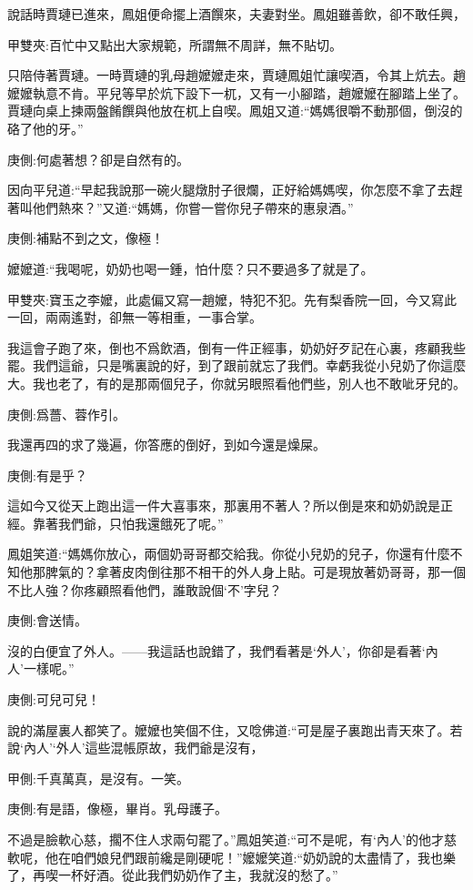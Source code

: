 \begin{parag}
    說話時賈璉已進來，鳳姐便命擺上酒饌來，夫妻對坐。鳳姐雖善飲，卻不敢任興，\begin{note}甲雙夾:百忙中又點出大家規範，所謂無不周詳，無不貼切。\end{note}只陪侍著賈璉。一時賈璉的乳母趙嬤嬤走來，賈璉鳳姐忙讓喫酒，令其上炕去。趙嬤嬤執意不肯。平兒等早於炕下設下一杌，又有一小腳踏，趙嬤嬤在腳踏上坐了。賈璉向桌上揀兩盤餚饌與他放在杌上自喫。鳳姐又道:“媽媽很嚼不動那個，倒沒的硌了他的牙。”\begin{note}庚側:何處著想？卻是自然有的。\end{note}因向平兒道:“早起我說那一碗火腿燉肘子很爛，正好給媽媽喫，你怎麼不拿了去趕著叫他們熱來？”又道:“媽媽，你嘗一嘗你兒子帶來的惠泉酒。”\begin{note}庚側:補點不到之文，像極！\end{note}嬤嬤道:“我喝呢，奶奶也喝一鍾，怕什麼？只不要過多了就是了。\begin{note}甲雙夾:寶玉之李嬤，此處偏又寫一趙嬤，特犯不犯。先有梨香院一回，今又寫此一回，兩兩遙對，卻無一等相重，一事合掌。\end{note}我這會子跑了來，倒也不爲飲酒，倒有一件正經事，奶奶好歹記在心裏，疼顧我些罷。我們這爺，只是嘴裏說的好，到了跟前就忘了我們。幸虧我從小兒奶了你這麼大。我也老了，有的是那兩個兒子，你就另眼照看他們些，別人也不敢呲牙兒的。\begin{note}庚側:爲薔、蓉作引。\end{note}我還再四的求了幾遍，你答應的倒好，到如今還是燥屎。\begin{note}庚側:有是乎？\end{note}這如今又從天上跑出這一件大喜事來，那裏用不著人？所以倒是來和奶奶說是正經。靠著我們爺，只怕我還餓死了呢。”
\end{parag}


\begin{parag}
    鳳姐笑道:“媽媽你放心，兩個奶哥哥都交給我。你從小兒奶的兒子，你還有什麼不知他那脾氣的？拿著皮肉倒往那不相干的外人身上貼。可是現放著奶哥哥，那一個不比人強？你疼顧照看他們，誰敢說個‘不’字兒？\begin{note}庚側:會送情。\end{note}沒的白便宜了外人。——我這話也說錯了，我們看著是‘外人’，你卻是看著‘內人’一樣呢。”\begin{note}庚側:可兒可兒！\end{note}說的滿屋裏人都笑了。嬤嬤也笑個不住，又唸佛道:“可是屋子裏跑出青天來了。若說‘內人’‘外人’這些混帳原故，我們爺是沒有，\begin{note}甲側:千真萬真，是沒有。一笑。\end{note}\begin{note}庚側:有是語，像極，畢肖。乳母護子。\end{note}不過是臉軟心慈，擱不住人求兩句罷了。”鳳姐笑道:“可不是呢，有‘內人’的他才慈軟呢，他在咱們娘兒們跟前纔是剛硬呢！”嬤嬤笑道:“奶奶說的太盡情了，我也樂了，再喫一杯好酒。從此我們奶奶作了主，我就沒的愁了。”
\end{parag}


